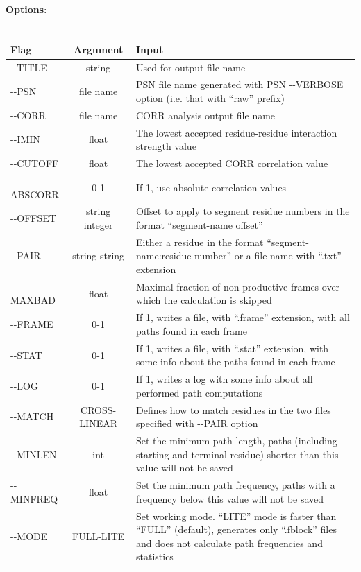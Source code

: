 \documentclass[11pt,twoside,onecolumn,a4paper,openright,notitlepage]{book}[2001/04/21]
\begin{document}
\textbf{\large Options}:\\\\
\begin{longtable}{l|c|p{7.0cm}}
\bf{Flag} & \bf{Argument} & \bf{Input}\\
\hline\endhead
-{}-TITLE         & string         & Used for output file name\\
-{}-PSN           & file name      & PSN file name generated with PSN -{}-VERBOSE option (i.e. that with ``raw'' prefix)\\
-{}-CORR          & file name      & CORR analysis output file name\\
-{}-IMIN          & float          & The lowest accepted residue-residue interaction strength value\\
-{}-CUTOFF        & float          & The lowest accepted CORR correlation value\\
-{}-ABSCORR       & 0-1            & If 1, use absolute correlation values\\
-{}-OFFSET        & string integer & Offset to apply to segment residue numbers in the format ``segment-name offset''\\
-{}-PAIR          & string string  & Either a residue in the format ``segment-name:residue-number'' or a file name with ``.txt'' extension\\
-{}-MAXBAD        & float          & Maximal fraction of non-productive frames over which the calculation is skipped\\
-{}-FRAME         & 0-1            & If 1, writes a file, with ``.frame'' extension, with all paths found in each frame\\
-{}-STAT          & 0-1            & If 1, writes a file, with ``.stat'' extension, with some info about the paths found in each frame\\
-{}-LOG           & 0-1            & If 1, writes a log with some info about all performed path computations\\
-{}-MATCH         & CROSS-LINEAR   & Defines how to match residues in the two files specified with -{}-PAIR option\\
-{}-MINLEN        & int            & Set the minimum path length, paths (including starting and terminal residue) shorter than this value will not be saved\\
-{}-MINFREQ       & float          & Set the minimum path frequency, paths with a frequency below this value will not be saved\\
-{}-MODE          & FULL-LITE      & Set working mode. ``LITE'' mode is faster than ``FULL'' (default), generates only ``.fblock'' files and does not calculate path frequencies and statistics\\

\end{longtable}
\end{document}
